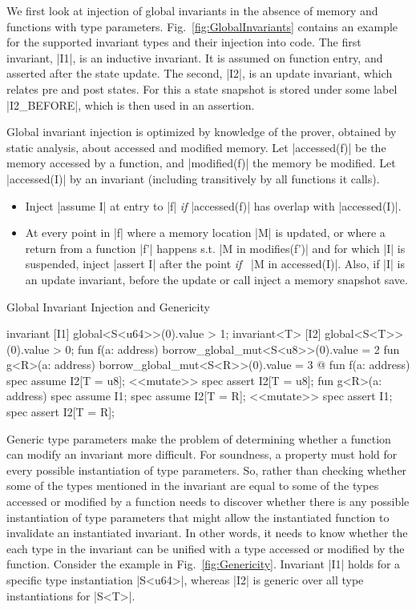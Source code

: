 We first look at injection of global invariants in the absence of memory and
functions with type parameters. Fig.~\ref{fig:GlobalInvariants} contains an
example for the supported invariant types and their injection into code. The
first invariant, |I1|, is an inductive invariant. It is assumed on function
entry, and asserted after the state update. The second, |I2|, is an update
invariant, which relates pre and post states. For this a state snapshot is
stored under some label |I2_BEFORE|, which is then used in an assertion.

Global invariant injection is optimized by knowledge of the prover, obtained by
static analysis, about accessed and modified memory.  Let |accessed(f)| be the
memory accessed by a function, and |modified(f)| the memory be modified. Let
|accessed(I)| by an invariant (including transitively by all functions it
calls).

\begin{itemize}
\item Inject |assume I| at entry to |f| \emph{if} |accessed(f)| has overlap with
  |accessed(I)|.
\item At every point in |f| where a memory location |M| is updated, or where a
  return from a function |f'| happens s.t. |M in modifies(f')| and for
  which |I| is suspended, inject |assert I| after the point \emph{if}~%
  |M in accessed(I)|. Also, if |I| is an update invariant, before the update or
  call inject a memory snapshot save.
\end{itemize}


\begin{Figure}
  \caption{Global Invariant Injection and Genericity}
  \label{fig:Genericity}
  \centering
\begin{MoveBox}
  invariant [I1] global<S<u64>>(0).value > 1;
  invariant<T> [I2] global<S<T>>(0).value > 0;
  fun f(a: address) { borrow_global_mut<S<u8>>(0).value = 2 }
  fun g<R>(a: address) { borrow_global_mut<S<R>>(0).value = 3 }
  @\transform@
  fun f(a: address) {
    spec assume I2[T = u8];
    <<mutate>>
    spec assert I2[T = u8];
  }
  fun g<R>(a: address) {
    spec assume I1;
    spec assume I2[T = R];
    <<mutate>>
    spec assert I1;
    spec assert I2[T = R];
  }
\end{MoveBox}
\end{Figure}

Generic type parameters make the problem of determining whether a function can
modify an invariant more difficult.  For soundness, a property must hold for
every possible instantiation of type parameters.  So, rather than checking
whether some of the types mentioned in the invariant are equal to some of the
types accessed or modified by a function \MVP needs to discover whether there is
any possible instantiation of type parameters that might allow the instantiated
function to invalidate an instantiated invariant.  In other words, it needs to
know whether the each type in the invariant can be unified with a type accessed
or modified by the function.  Consider the example in
Fig.~\ref{fig:Genericity}. Invariant |I1| holds for a specific type
instantiation |S<u64>|, whereas |I2| is generic over all type instantiations for
|S<T>|.

